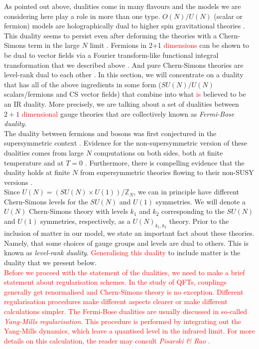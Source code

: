         \indent As pointed out above, dualities come in many flavours and the models we are considering here play a role in more than one type. $O(N)/U(N)$ (scalar or fermion) models are holographically dual to higher spin gravitational theories \cite{Klebanov:2002ja}. This duality seems to persist even after deforming the theories with a Chern-Simons term in the large $N$ limit \cite{Aharony:2011jz}. Fermions in 2+1 \textcolor{red}{dimensions} can be shown to be dual to vector fields via a Fourier transform-like functional integral transformation that we described above \cite{Burgess:1993np, Barci:1995iy}. And pure Chern-Simons theories are level-rank dual to each other \cite{Naculich:1990pa, Camperi:1990dk, Mlawer:1990uv, Nakanishi:1990hj, Naculich:2007nc}. In this section, we will concentrate on a duality that has all of the above ingredients in some form ($SU(N)/U(N)$ scalars/fermions and CS vector fields) that combine into what \textcolor{red}{is} believed to be an IR duality. More precisely, we are talking about a set of dualities between $2+1$ \textcolor{red}{dimensional} gauge theories that are collectively known as \textit{Fermi-Bose duality}.\\
        \indent The duality between fermions and bosons was first conjectured  in the supersymmetric context \cite{Giveon:2008zn, Benini:2011mf, Aharony:2013dha, Aharony:2014uya}. Evidence for the non-supersymmetric version of these dualities comes from large $N$ computations on both sides\textcolor{red}{,} both at finite temperature \cite{Aharony:2012ns}  and at $T=0$ \cite{Giombi:2011kc}. Furthermore, there is compelling evidence that the duality holds at finite $N$ from supersymmetric theories flowing to their non-SUSY versions \cite{Jain:2013gza, Gur-Ari:2015pca}.\\
        \indent Since $U(N) = (SU(N)\times U(1))/\mathbb{Z}_N$, we can in principle have different Chern-Simons levels for the $SU(N)$ and $U(1)$ symmetries. We will denote a $U(N)$ Chern-Simons theory with levels $k_1$ and $k_2$ corresponding to the $SU(N)$ and $U(1)$ symmetries, respectively, as a $U(N)_{k_1,k_2}$ theory. Prior to the inclusion of matter in our model, we state an important fact about these theories. Namely, that some choices of gauge groups and levels are dual to others. This is known as \textit{level-rank duality}. \textcolor{red}{Generalising this duality} to include matter is the duality that we present below.\\
\indent \textcolor{red}{Before we proceed with the statement of the dualities, we need to make a brief statement about regularisation schemes. In the study of QFTs, couplings generally get renormali\textcolor{red}{s}ed and Chern-Simons theory is no exception. Different regularisation procedures make different aspects clearer or make different calculations simpler. The Fermi-Bose dualities are usually discussed in so-called \textit{Yang-Mills regularisation}. This procedure is performed by integrating out the Yang-Mills dynamics, which leave a quanti\textcolor{red}{s}ed level in the infrared limit. For more details on this calculation, the reader may consult \textit{Pisarski \& Rao} \cite{PhysRevD.32.2081}.}\\
